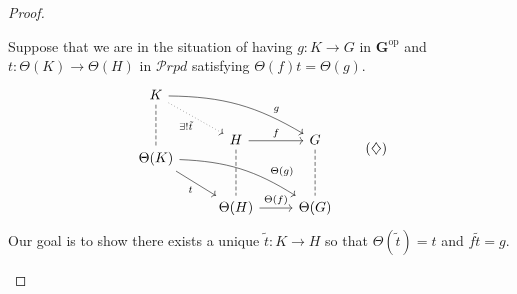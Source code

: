 \documentclass{amsart}
\numberwithin{theorem}{subsection}
\theoremstyle{definition}
\providecommand{\op}{\mathrm{op}}
\newcommand{\bbY}{\mathbf{G}}
\newcommand{\calproperad}{\mathcal{P}rpd}
\begin{document}
\begin{proof}
\begin{enumerate}
Suppose that we are in the situation of having $g \colon K \to G$ in $\bbY^{\op}$ and $t \colon \Theta(K) \to \Theta(H)$ in $\calproperad$ satisfying $\Theta(f) t = \Theta(g)$.
\begin{equation*}\label{eq original cartesian lifting problem} \begin{tikzcd}
K \arrow[drr, bend left=15, "g" near end] \arrow[dd, no head, dashed] \arrow[dr, dotted, "\exists ! \tilde t" swap] \\
& H \arrow[dd, no head, dashed] \rar["f"]& G \arrow[dd, no head, dashed] \\[-2em]
\Theta(K) \arrow[drr, bend left=15, "\Theta(g)" near end]
\arrow[dr, "t" swap]
\\
& \Theta(H) \rar["\Theta(f)"]& \Theta(G)
\end{tikzcd} \tag{$\diamondsuit$}
\end{equation*}
Our goal is to show there exists a unique $\tilde t \colon K \to H$ so that $\Theta(\tilde t) = t$ and $f\tilde t = g$.


\end{enumerate}
\end{proof}
\end{document}
